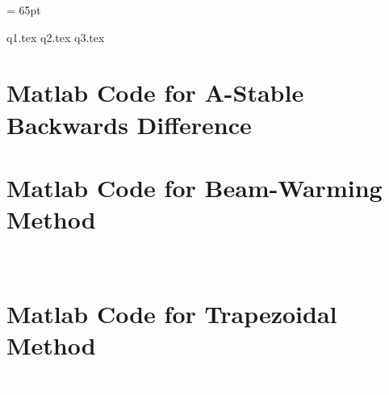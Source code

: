 \documentclass[12pt]{extarticle}
\begin{document}
      

        \thispagestyle{firstpage}
        \headsep = 65pt %

        {q1.tex}     
        {q2.tex}
        {q3.tex}

        \pagebreak
        \section*{Matlab Code for A-Stable Backwards Difference}
        

        \pagebreak
        \section*{Matlab Code for Beam-Warming Method}
        
        \textcolor{white}{a}

        \pagebreak
        \section*{Matlab Code for Trapezoidal Method}
        
        \textcolor{white}{a}
\end{document}

